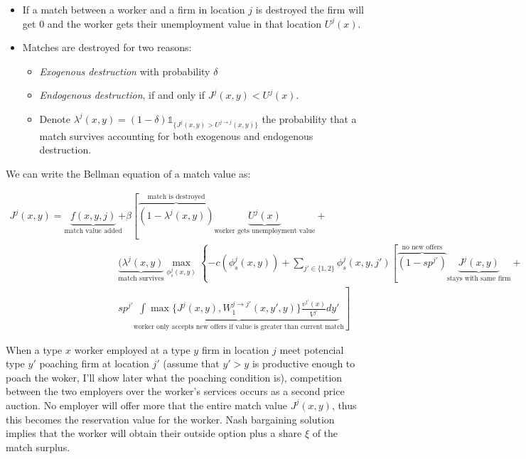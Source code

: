 \documentclass[
  letterpaper,
  DIV=11,
  numbers=noendperiod]{scrartcl}
\providecommand{\tightlist}{%
  \setlength{\itemsep}{0pt}\setlength{\parskip}{0pt}}\usepackage{longtable,booktabs,array}
\begin{document}
\begin{itemize}
\tightlist
\item
  If a match between a worker and a firm in location \(j\) is destroyed
  the firm will get \(0\) and the worker gets their unemployment value
  in that location \(U^{j}(x)\).
\item
  Matches are destroyed for two reasons:

  \begin{itemize}
  \tightlist
  \item
    \emph{Exogenous destruction} with probability \(\delta\)
  \item
    \emph{Endogenous destruction}, if and only if \(J^j(x,y) < U^j(x)\).
  \item
    Denote
    \(\lambda^j(x,y) = (1-\delta)\mathbb{1}_{\{J^j(x,y)>U^{j\to j}(x,y)\}}\)
    the probability that a match survives accounting for both exogenous
    and endogenous destruction.
  \end{itemize}
\end{itemize}

We can write the Bellman equation of a match value as:

\begin{align*}
J^j(x,y) = \underbrace{f(x,y,j)}_{\text{match value added}} &+ \beta\left[  \overbrace{ (1-\lambda^j(x,y)) }^{\text{match is destroyed}}\underbrace{U^{j}(x)}_{\text{worker gets unemployment value}} \right. + \\
  & \underbrace{(\lambda^j(x,y)}_{\text{match survives}} \max_{\phi_s^j(x,y)}\left\{-c(\phi_s^j(x,y)) +  \sum_{j'\in\{1,2\}}\phi^j_s(x,y,j')\left[ \overbrace{(1-sp^{j'})}^{\text{no new offers}} \underbrace{J^j(x,y)}_{\text{stays with same firm}} \right. \right. +\\
& sp^{j'} \left. \underbrace{\int\max\{J^{j}(x,y),W^{j\to j'}_{1}(x,y',y)\}\frac{v^{j'}(x)}{V^{j'}}dy'}_{\text{worker only accepts new offers if value is greater than current match}}  \right]
\end{align*}

When a type \(x\) worker employed at a type \(y\) firm in location \(j\)
meet potencial type \(y'\) poaching firm at location \(j'\) (assume that
\(y'>y\) is productive enough to poach the woker, I'll show later what
the poaching condition is), competition between the two employers over
the worker's services occurs as a second price auction. No employer will
offer more that the entire match value \(J^j(x,y)\), thus this becomes
the reservation value for the worker. Nash bargaining solution implies
that the worker will obtain their outside option plus a share \(\xi\) of
the match surplus.
\end{document}
